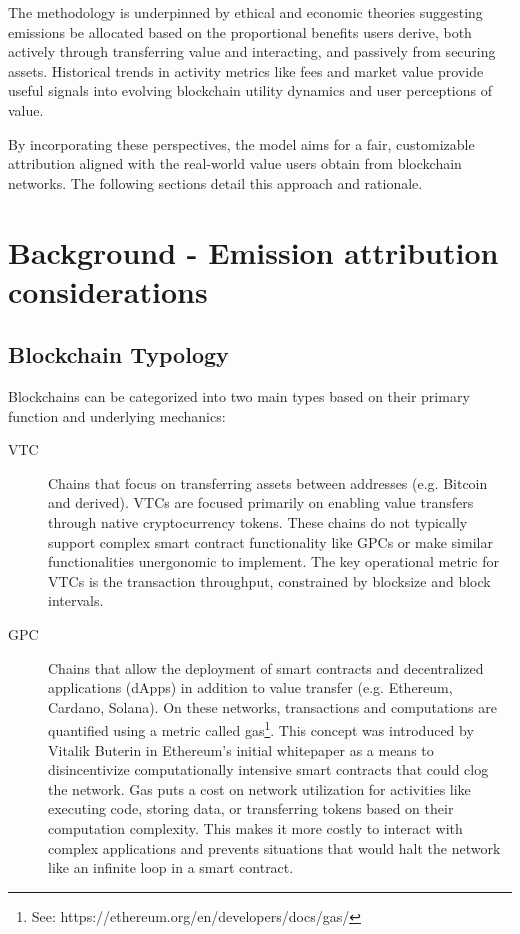 \documentclass[11pt]{report}
\begin{document}
The methodology is underpinned by ethical and economic theories suggesting emissions be allocated based on the proportional benefits users derive, both actively through transferring value and interacting, and passively from securing assets. Historical trends in activity metrics like fees and market value provide useful signals into evolving blockchain utility dynamics and user perceptions of value.

By incorporating these perspectives, the model aims for a fair, customizable attribution aligned with the real-world value users obtain from blockchain networks. The following sections detail this approach and rationale.

\section{Background - Emission attribution considerations}

\subsection{Blockchain Typology}
Blockchains can be categorized into two main types based on their primary function and underlying mechanics:

\begin{description}
    \item[\ac{VTC}] Chains that focus on transferring assets between addresses (e.g. Bitcoin and derived). VTCs are focused primarily on enabling value transfers through native cryptocurrency tokens. These chains do not typically support complex smart contract functionality like GPCs or make similar functionalities unergonomic to implement. The key operational metric for VTCs is the transaction throughput, constrained by blocksize and block intervals.

    \item[\ac{GPC}] Chains that allow the deployment of smart contracts and decentralized applications (dApps) in addition to value transfer (e.g. Ethereum, Cardano, Solana). On these networks, transactions and computations are quantified using a metric called gas\footnote{See: https://ethereum.org/en/developers/docs/gas/}. This concept was introduced by Vitalik Buterin in Ethereum's initial whitepaper \cite{buterinEthereumNextgenerationSmart} as a means to disincentivize computationally intensive smart contracts that could clog the network. Gas puts a cost on network utilization for activities like executing code, storing data, or transferring tokens based on their computation complexity. This makes it more costly to interact with complex applications and prevents situations that would halt the network like an infinite loop in a smart contract.
\end{description}
\end{document}
